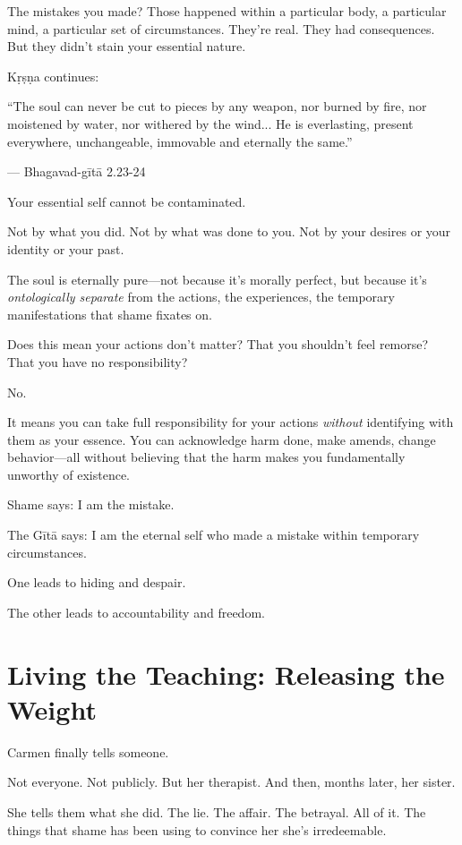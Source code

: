 \documentclass[11pt,twoside]{book}
\begin{document}
The mistakes you made? Those happened within a particular body, a particular mind, a particular set of circumstances. They're real. They had consequences. But they didn't stain your essential nature.

Kṛṣṇa continues:

\begin{pullquote}
``The soul can never be cut to pieces by any weapon, nor burned by fire, nor moistened by water, nor withered by the wind... He is everlasting, present everywhere, unchangeable, immovable and eternally the same.''

--- Bhagavad-gītā 2.23-24
\end{pullquote}

Your essential self cannot be contaminated.

Not by what you did. Not by what was done to you. Not by your desires or your identity or your past.

The soul is eternally pure—not because it's morally perfect, but because it's \emph{ontologically separate} from the actions, the experiences, the temporary manifestations that shame fixates on.

Does this mean your actions don't matter? That you shouldn't feel remorse? That you have no responsibility?

No.

It means you can take full responsibility for your actions \emph{without} identifying with them as your essence. You can acknowledge harm done, make amends, change behavior—all without believing that the harm makes you fundamentally unworthy of existence.

Shame says: I am the mistake.

The Gītā says: I am the eternal self who made a mistake within temporary circumstances.

One leads to hiding and despair.

The other leads to accountability and freedom.

\section*{Living the Teaching: Releasing the Weight}

Carmen finally tells someone.

Not everyone. Not publicly. But her therapist. And then, months later, her sister.

She tells them what she did. The lie. The affair. The betrayal. All of it. The things that shame has been using to convince her she's irredeemable.
\end{document}
